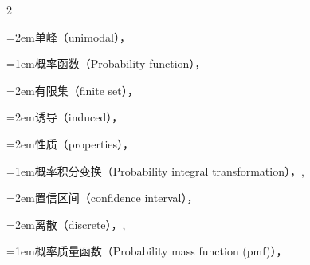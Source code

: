 \begin{multicols}{2}
\par\noindent\hangindent=2em\hspace*{1em}\label{idx:842}单峰（unimodal），\hyperref[exercise:2.27]{\pageref*{exercise:2.27}}\par
\par\addvspace{2pt}
\par\noindent\hangindent=1em\hspace*{0em}\label{idx:843}概率函数（Probability function），\hyperref[def:1.2.4]{\pageref*{def:1.2.4}}\par
\par\noindent\hangindent=2em\hspace*{1em}\label{idx:844}有限集（finite set），\hyperref[thm:1.2.6]{\pageref*{thm:1.2.6}}\par
\par\noindent\hangindent=2em\hspace*{1em}\label{idx:845}诱导（induced），\hyperref[eq:1.4.1]{\pageref*{eq:1.4.1}}\par
\par\noindent\hangindent=2em\hspace*{1em}\label{idx:846}性质（properties），\hyperref[thm:1.2.8]{\pageref*{thm:1.2.8}}\par
\par\addvspace{2pt}
\par\noindent\hangindent=1em\hspace*{0em}\label{idx:847}概率积分变换（Probability integral transformation），\hyperref[thm:2.1.10]{\pageref*{thm:2.1.10}}, \hyperref[ex:5.6.3]{\pageref*{ex:5.6.3}}\par
\par\noindent\hangindent=2em\hspace*{1em}\label{idx:848}置信区间（confidence interval），\hyperref[thm:9.2.12]{\pageref*{thm:9.2.12}}\par
\par\noindent\hangindent=2em\hspace*{1em}\label{idx:849}离散（discrete），\hyperref[exercise:2.10]{\pageref*{exercise:2.10}}, \hyperref[thm:9.2.14]{\pageref*{thm:9.2.14}}\par
\par\addvspace{2pt}
\par\noindent\hangindent=1em\hspace*{0em}\label{idx:850}概率质量函数（Probability mass function (pmf)），\hyperref[def:1.6.1]{\pageref*{def:1.6.1}}\par

\end{multicols}
